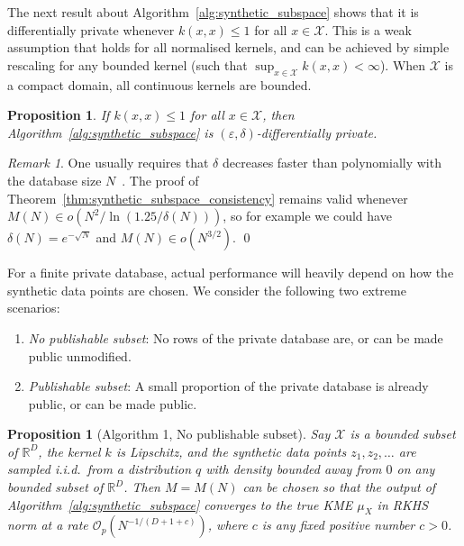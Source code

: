 \documentclass{article}
\newcommand{\calO}{\mathcal{O}}			%
\newcommand{\calX}{\mathcal{X}}			%
\newcommand{\IR}{\mathbb{R}}  			%
\theoremstyle{plain}
\newtheorem{proposition}[theorem]{Proposition}
\theoremstyle{remark}
\newtheorem{remark}[theorem]{Remark}
\theoremstyle{definition}
\begin{document}
The next result about Algorithm~\ref{alg:synthetic_subspace} shows that it is differentially private whenever $k(x, x) \leq 1$ for all $x \in \calX$. This is a weak assumption that holds for all normalised kernels, and can be achieved by simple rescaling for any bounded kernel (such that $\sup_{x \in \calX} k(x, x) < \infty$). When $\calX$ is a compact domain, all continuous kernels are bounded.

\begin{proposition}
	\label{prop:synthetic_subspace_privacy}
	If $k(x, x) \leq 1$ for all $x \in \calX$, then Algorithm~\ref{alg:synthetic_subspace} is $(\varepsilon, \delta)$-differentially private.
\end{proposition}

\begin{remark}
	\label{rem:privacy_params}
	One usually requires that $\delta$ decreases faster than polynomially with the database size $N$~\cite{dwork_algorithmic_2014}. The proof of Theorem~\ref{thm:synthetic_subspace_consistency} remains valid whenever $M(N) \in o(N^2 / \ln(1.25 / \delta(N)))$, so for example we could have $\delta(N) = e^{-\sqrt{N}}$ and $M(N) \in o(N^{3/2})$.
  \qed
\end{remark}

For a finite private database, actual performance will heavily depend on how the synthetic data points are chosen. We consider the following two extreme scenarios:
\begin{enumerate}
	\vspace{-0.5em}
	\item \emph{No publishable subset}: No rows of the private database are, or can be made public unmodified.
	\item \emph{Publishable subset}: A small proportion of the private database is already public, or can be made public.
\end{enumerate}

\begin{proposition}[Algorithm 1, No publishable subset]
\label{prop:alg1_rate_no_publishable_subset}
Say $\calX$ is a bounded subset of $\IR^D$, the kernel $k$ is Lipschitz, and the synthetic data points $z_1, z_2, \ldots$ are sampled i.i.d.~from a distribution $q$ with density bounded away from $0$ on any bounded subset of $\IR^D$. Then $M = M(N)$ can be chosen so that the output of Algorithm~\ref{alg:synthetic_subspace} converges to the true KME $\mu_X$ in RKHS norm at a rate $\calO_p(N^{-1/(D+1+c)})$, where $c$ is any fixed positive number $c > 0$.
\end{proposition}
\end{document}
